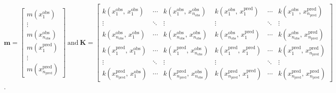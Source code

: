          \vspace{1em}

         \(\mathbf{m} = 
         \begin{bmatrix}
            m(x_{1}^{\text{obs}}) \\
            \vdots \\
            m(x_{n_{\text{obs}}}^{\text{obs}}) \\
            m(x_{1}^{\text{pred}}) \\
            \vdots \\
            m(x_{n_{\text{pred}}}^{\text{pred}})
         \end{bmatrix}  
         \: 
         \text{and}
         \:
         \mathbf{K} = 
         \begin{bmatrix}
            k(x_{1}^{\text{obs}}, \, x_{1}^{\text{obs}}) 
            & \cdots 
            & k(x_{1}^{\text{obs}}, \, x_{n_{\text{obs}}}^{\text{obs}}) 
            & k(x_{1}^{\text{obs}}, \, x_{1}^{\text{pred}}) 
            & \cdots 
            & k(x_{1}^{\text{obs}}, \, x_{n_{\text{pred}}}^{\text{pred}}) \\
            
            \vdots & \ddots & \vdots & \vdots & \ddots & \vdots \\
            
            k(x_{n_{\text{obs}}}^{\text{obs}}, \, x_{1}^{\text{obs}}) 
            & \cdots 
            & k(x_{n_{\text{obs}}}^{\text{obs}}, \, x_{n_{\text{obs}}}^{\text{obs}}) 
            & k(x_{n_{\text{obs}}}^{\text{obs}}, \, x_{1}^{\text{pred}}) 
            & \cdots 
            & k(x_{n_{\text{obs}}}^{\text{obs}}, \, x_{n_{\text{pred}}}^{\text{pred}}) \\
            
            k(x_{1}^{\text{pred}}, \, x_{1}^{\text{obs}}) 
            & \cdots 
            & k(x_{1}^{\text{pred}}, \, x_{n_{\text{obs}}}^{\text{obs}}) 
            & k(x_{1}^{\text{pred}}, \, x_{1}^{\text{pred}}) 
            & \cdots 
            & k(x_{1}^{\text{pred}}, \, x_{n_{\text{pred}}}^{\text{pred}}) \\
            
            \vdots & \ddots & \vdots & \vdots & \ddots & \vdots \\
            
            k(x_{n_{\text{pred}}}^{\text{pred}}, \, x_{1}^{\text{obs}}) 
            & \cdots 
            & k(x_{n_{\text{pred}}}^{\text{pred}}, \, x_{n_{\text{obs}}}^{\text{obs}}) 
            & k(x_{n_{\text{pred}}}^{\text{pred}}, \, x_{1}^{\text{pred}}) 
            & \cdots 
            & k(x_{n_{\text{pred}}}^{\text{pred}}, \, x_{n_{\text{pred}}}^{\text{pred}})
         \end{bmatrix}\).


